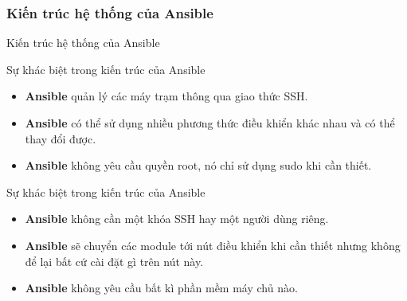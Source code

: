 \documentclass[14pt]{beamer}
\begin{document}
\subsubsection*{Kiến trúc hệ thống của Ansible}

\begin{frame}{Kiến trúc hệ thống của Ansible}
  \begin{center}
  \end{center}
\end{frame}


\begin{frame}{Sự khác biệt trong kiến trúc của Ansible}
\renewcommand{\baselinestretch}{1.50}\normalsize
  \begin{itemize}
    \item \textbf{Ansible} quản lý các máy trạm thông qua giao thức SSH.
    \item \textbf{Ansible} có thể sử dụng nhiều phương thức điều khiển khác nhau và có thể thay đổi được.
    \item \textbf{Ansible} không yêu cầu quyền root, nó chỉ sử dụng sudo khi cần thiết.
  \end{itemize}
\renewcommand{\baselinestretch}{1.0}\normalsize
\end{frame}


\begin{frame}{Sự khác biệt trong kiến trúc của Ansible}
\renewcommand{\baselinestretch}{1.50}\normalsize
  \begin{itemize}
    \item \textbf{Ansible} không cần một khóa SSH hay một người dùng riêng.
    \item \textbf{Ansible} sẽ chuyển các module tới nút điều khiển khi cần thiết nhưng không để lại bất cứ cài đặt gì trên nút này.
    \item \textbf{Ansible} không yêu cầu bất kì phần mềm máy chủ nào.
  \end{itemize}
\renewcommand{\baselinestretch}{1.0}\normalsize
\end{frame}
\end{document}
